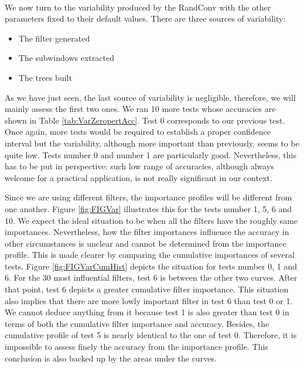 \documentclass[a4paper]{report}
\begin{document}
		\paragraph{}
		We now turn to the variability produced by the RandConv with the other parameters fixed to their default values. There are three sources of variability:
		
		\begin{itemize}
			\item The filter generated
			\item The subwindows extracted
			\item The trees built
		\end{itemize}
		
		As we have just seen, the last source of variability is negligible, therefore, we will mainly assess the first two ones. We ran 10 more tests whose accuracies are shown in Table \ref{tab:VarZeropertAcc}. Test 0 corresponds to our previous test. Once again, more tests would be required to establish a proper confidence interval but the variability, although more important than previously, seems to be quite low. Tests number 0 and number 1 are particularly good. Nevertheless, this has to be put in perspective: such low range of accuracies, although always welcome for a practical application, is not really significant in our context.
		\par
		Since we are using different filters, the importance profiles will be different from one another. Figure \ref{fig:FIGVar} illustrates this for the tests number 1, 5, 6 and 10. We expect the ideal situation to be when all the filters have the roughly same importances. Nevertheless, how the filter importances influence the accuracy in other circumstances is unclear and cannot be determined from the importance profile. This is made clearer by comparing the cumulative importances of several tests. Figure \ref{fig:FIGVarCumHist} depicts the situation for tests number 0, 1 and 6. For the 30 most influential filters, test 6 is between the other two curves. After that point, test 6 depicts a greater cumulative filter importance. This situation also implies that there are more lowly important filter in test 6 than test 0 or 1. We cannot deduce anything from it because test 1 is also greater than test 0 in terms of both the cumulative filter importance and accuracy. Besides, the cumulative profile of test 5 is nearly identical to the one of test 0. Therefore, it is impossible to assess finely the accuracy from the importance profile. This conclusion is also backed up by the areas under the curves.
		
\end{document}
